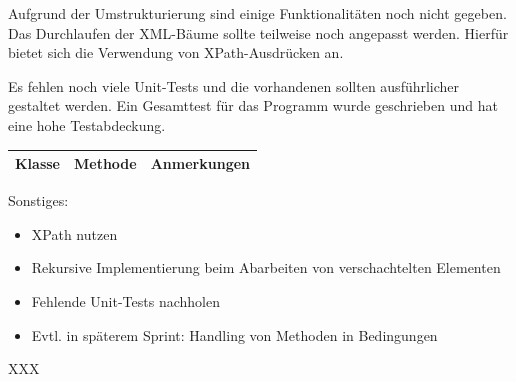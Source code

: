 Aufgrund der Umstrukturierung sind einige Funktionalitäten noch nicht gegeben. Das Durchlaufen der XML-Bäume sollte teilweise noch angepasst werden. Hierfür bietet sich die Verwendung von XPath-Ausdrücken an.
\nsecend%

Es fehlen noch viele Unit-Tests und die vorhandenen sollten ausführlicher gestaltet werden.
Ein Gesamttest für das Programm wurde geschrieben und hat eine hohe Testabdeckung.
\nsecend%

\begin{table}[H]

\begin{tabularx}{\textwidth}{ |l|l|X| }
\hline
\textbf{Klasse} & \textbf{Methode} & \textbf{Anmerkungen}\\
 \hline
\hline
\end{tabularx}
\end{table}

Sonstiges:
\begin{itemize}
\item XPath nutzen
\item Rekursive Implementierung beim Abarbeiten von verschachtelten Elementen
\item Fehlende Unit-Tests nachholen
\item Evtl. in späterem Sprint: Handling von Methoden in Bedingungen
\end{itemize}
\nsecend%


\nsecend%

XXX
\nsecend%


\nsecend%